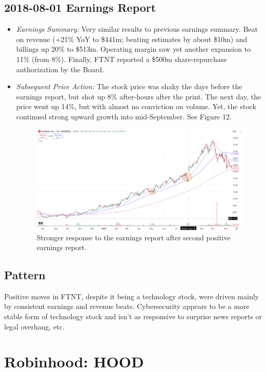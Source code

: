 \documentclass[11pt]{article}
\begin{document}
    \subsection{2018-08-01 Earnings Report}
        \begin{itemize}
            \item \textit{Earnings Summary:} Very similar results to previous earnings summary. Beat on revenue (+21\% YoY to \$441m; beating estimates by about \$10m) and billings up 20\% to \$513m. Operating margin saw yet another expansion to 11\% (from 8\%). Finally, FTNT reported a \$500m share-repurchase authorization by the Board.
            \item \textit{Subsequent Price Action:} The stock price was shaky the days before the earnings report, but shot up 8\% after-hours after the print. The next day, the price went up 14\%, but with almost no conviction on volume. Yet, the stock continued strong upward growth into mid-September. See Figure 12.
            \begin{figure}[h]
                \centering \includegraphics[width=0.8\linewidth]{images/FTNT2.png}
                \caption{Stronger response to the earnings report after second positive earnings report.}
            \end{figure}
        \end{itemize}
    \subsection{Pattern}
        Positive moves in FTNT, despite it being a technology stock, were driven mainly by consistent earnings and revenue beats. Cybersecurity appears to be a more stable form of technology stock and isn't as responsive to surprise news reports or legal overhang, etc.
\section{Robinhood: HOOD}
\end{document}

